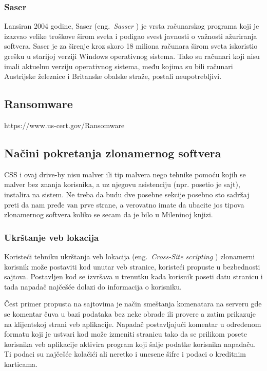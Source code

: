 \documentclass[a4paper]{article}
\begin{document}
\subsubsection{Saser}
Lansiran 2004 godine, Saser (eng.~{\em Sasser }) je vrsta računarskog programa koji je izazvao velike troškove širom sveta i podigao svest javnosti o važnosti ažuriranja softvera. Saser je za širenje kroz skoro 18 miliona računara širom sveta iskoristio grešku u starijoj verziji Windows operativnog sistema. Tako su računari koji nisu
imali aktuelnu verziju operativnog sistema, među kojima su bili računari Austrijske železnice i Britanske obalske straže, postali neupotrebljivi. \cite{ethics}

\subsection{Ransomware}
https://www.us-cert.gov/Ransomware

\subsection{Načini pokretanja zlonamernog softvera}

CSS i ovaj drive-by nisu malver ili tip malvera nego tehnike pomoću kojih se malver bez znanja korisnika, a uz njegovu asistenciju (npr. posetio je sajt), instalira na sistem. Ne treba da budu dve posebne sekcije posebno sto sadržaj preti da nam pređe van prve strane, a verovatno imate da ubacite jos tipova zlonamernog softvera koliko se secam da je bilo u Mileninoj knjizi.

\subsubsection{Ukrštanje veb lokacija}

Koristeći tehniku ukrštanja veb lokacija (eng.~{\em Cross-Site scripting }) zlonamerni korisnik može postaviti kod unutar veb stranice, koristeći propuste u bezbednosti sajtova. Postavljen kod se izvršava u trenutku kada korisnik poseti datu stranicu i tada napadač najčešće dolazi do informacija o korisniku. \cite{ethics,xss}

Čest primer propusta na sajtovima je način smeštanja komenatara na serveru gde se komentar čuva u bazi podataka bez neke obrade ili provere a zatim prikazuje na klijentskoj strani veb aplikacije. Napadač postavljajući komentar u određenom formatu koji je ustvari kod može izmeniti stranicu tako da se prilikom posete korisnika veb aplikacije aktivira program koji šalje podatke korisnika napadaču. Ti podaci su najčešće kolačići ali neretko i unesene šifre i podaci o kreditnim karticama. \cite{xss}
\end{document}
